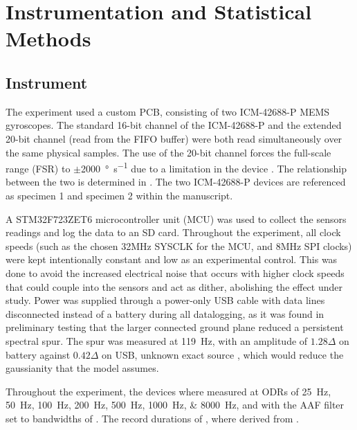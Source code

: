 \section{Instrumentation and Statistical Methods}
\label{sec:method}



\subsection{Instrument}
The experiment used a custom PCB, consisting of two ICM-42688-P MEMS gyroscopes. The standard 16-bit channel of the ICM-42688-P and the extended 20-bit channel (read from the FIFO buffer) were both read simultaneously over the same physical samples. The use of the 20-bit channel  forces the full-scale range (FSR) to $\pm$\SI{2000}{\degree\per\second} due to a limitation in the device . The relationship between the two is determined in . The two ICM-42688-P devices are referenced as specimen 1 and specimen 2 within the manuscript.

A STM32F723ZET6 microcontroller unit (MCU) was used to collect the sensors readings and log the data to an SD card.  Throughout the experiment, all clock speeds (such as the chosen 32MHz SYSCLK for the MCU, and 8MHz SPI clocks) were kept intentionally constant and low as an experimental control. This was done to avoid the increased electrical noise that occurs with higher clock speeds that could couple into the sensors and act as dither, abolishing the effect under study. Power was supplied through a power-only USB cable with data lines disconnected instead of a battery during all datalogging, as it was found in preliminary testing that the larger connected ground plane reduced a persistent spectral spur. The spur was measured at \SI{119}{\hertz}, with an amplitude of $1.28\Delta$ on battery against $0.42\Delta$ on USB, unknown exact source , which would reduce the gaussianity that the model assumes.

Throughout the experiment, the devices where measured at ODRs of \SIlist{25;50;100;200;500;1000;8000}{\hertz}, and with the AAF filter set to bandwidths of . The record durations of , where derived from .



